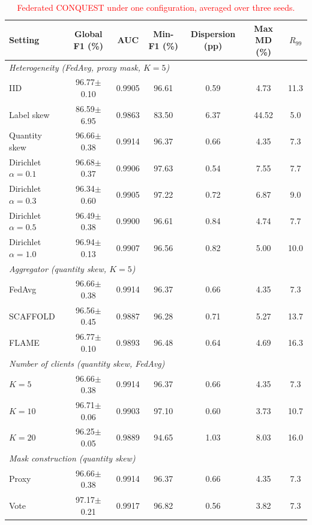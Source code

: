 \documentclass[conference]{IEEEtran}
\begin{document}
\begin{table}[!t]
\centering
\caption{\textcolor{red}{Federated CONQUEST under one configuration, averaged over three seeds.}}
\label{tab:fl_performance_extended}
\color{red}
\setlength{\tabcolsep}{4pt}
\renewcommand{\arraystretch}{1.05}
\begin{tabular}{lcccccc}
\hline\toprule
\textbf{Setting} & \textbf{Global F1 (\%)} & \textbf{AUC} & \textbf{Min-F1 (\%)} & \textbf{Dispersion (pp)} & \textbf{Max MD (\%)} & \textbf{$R_{99}$} \\
\hline\toprule
\multicolumn{7}{l}{\textit{Heterogeneity (FedAvg, proxy mask, $K{=}5$)}} \\
IID & 96.77$\pm$0.10 & 0.9905 & 96.61 & 0.59 & 4.73 & 11.3 \\
Label skew & 86.59$\pm$6.95 & 0.9863 & 83.50 & 6.37 & 44.52 & 5.0 \\
Quantity skew & 96.66$\pm$0.38 & 0.9914 & 96.37 & 0.66 & 4.35 & 7.3 \\
Dirichlet $\alpha{=}0.1$ & 96.68$\pm$0.37 & 0.9906 & 97.63 & 0.54 & 7.55 & 7.7 \\
Dirichlet $\alpha{=}0.3$ & 96.34$\pm$0.60 & 0.9905 & 97.22 & 0.72 & 6.87 & 9.0 \\
Dirichlet $\alpha{=}0.5$ & 96.49$\pm$0.38 & 0.9900 & 96.61 & 0.84 & 4.74 & 7.7 \\
Dirichlet $\alpha{=}1.0$ & 96.94$\pm$0.13 & 0.9907 & 96.56 & 0.82 & 5.00 & 10.0 \\
\midrule
\multicolumn{7}{l}{\textit{Aggregator (quantity skew, $K{=}5$)}} \\
FedAvg & 96.66$\pm$0.38 & 0.9914 & 96.37 & 0.66 & 4.35 & 7.3 \\
SCAFFOLD & 96.56$\pm$0.45 & 0.9887 & 96.28 & 0.71 & 5.27 & 13.7 \\
FLAME & 96.77$\pm$0.10 & 0.9893 & 96.48 & 0.64 & 4.69 & 16.3 \\
\midrule
\multicolumn{7}{l}{\textit{Number of clients (quantity skew, FedAvg)}} \\
$K{=}5$ & 96.66$\pm$0.38 & 0.9914 & 96.37 & 0.66 & 4.35 & 7.3 \\
$K{=}10$ & 96.71$\pm$0.06 & 0.9903 & 97.10 & 0.60 & 3.73 & 10.7 \\
$K{=}20$ & 96.25$\pm$0.05 & 0.9889 & 94.65 & 1.03 & 8.03 & 16.0 \\
\midrule
\multicolumn{7}{l}{\textit{Mask construction (quantity skew)}} \\
Proxy & 96.66$\pm$0.38 & 0.9914 & 96.37 & 0.66 & 4.35 & 7.3 \\
Vote & 97.17$\pm$0.21 & 0.9917 & 96.82 & 0.56 & 3.82 & 7.3 \\

\end{tabular}
\end{table}
\end{document}
